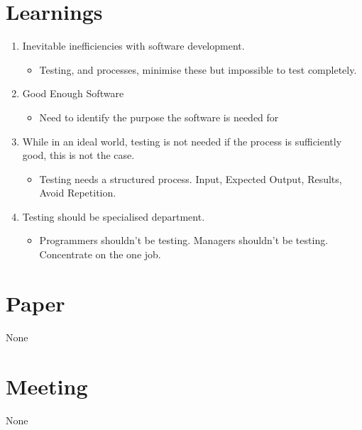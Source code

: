 \section{Learnings}
\begin{enumerate}
\item Inevitable inefficiencies with software development. 
\begin{itemize}
\item Testing, and processes, minimise these but impossible to test completely.
\end{itemize}
\item Good Enough Software
\begin{itemize}
\item Need to identify the purpose the software is needed for
\end{itemize}
\item While in an ideal world, testing is not needed if the process is sufficiently good, this is not the case.
\begin{itemize}
\item Testing needs a structured process. Input, Expected Output, Results, Avoid Repetition.
\end{itemize}
\item Testing should be specialised department.
\begin{itemize}
\item Programmers shouldn't be testing. Managers shouldn't be testing. Concentrate on the one job.
\end{itemize}
\end{enumerate}

\section{Paper}

None

\section{Meeting}

None
